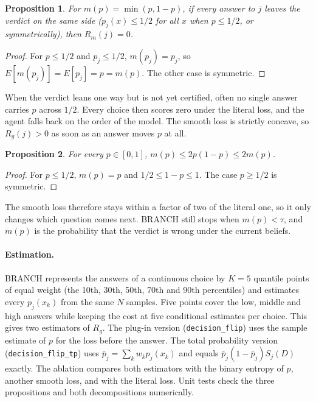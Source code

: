 \documentclass{article}
\newtheorem{proposition}{Proposition}
\begin{document}
\begin{proposition}\label{prop:stall}
For $m(p)=\min(p,1-p)$, if every answer to $j$ leaves the verdict on the same side ($p_j(x)\le 1/2$ for
all $x$ when $p\le 1/2$, or symmetrically), then $R_m(j)=0$.
\end{proposition}
\begin{proof}
For $p\le 1/2$ and $p_j\le 1/2$, $m(p_j)=p_j$, so $E[m(p_j)]=E[p_j]=p=m(p)$. The other case is symmetric.
\end{proof}

When the verdict leans one way but is not yet certified, often no single answer carries $p$ across
$1/2$. Every choice then scores zero under the literal loss, and the agent falls back on the order of the
model. The smooth loss is strictly concave, so $R_g(j)>0$ as soon as an answer moves $p$ at all.

\begin{proposition}\label{prop:bounds}
For every $p\in[0,1]$, $m(p)\le 2p(1-p)\le 2m(p)$.
\end{proposition}
\begin{proof}
For $p\le 1/2$, $m(p)=p$ and $1/2\le 1-p\le 1$. The case $p\ge 1/2$ is symmetric.
\end{proof}

The smooth loss therefore stays within a factor of two of the literal one, so it only changes which
question comes next. BRANCH still stops when $m(p)<\tau$, and $m(p)$ is the probability that the verdict
is wrong under the current beliefs.

\paragraph{Estimation.}
BRANCH represents the answers of a continuous choice by $K=5$ quantile points of equal weight (the
10th, 30th, 50th, 70th and 90th percentiles) and estimates every $p_j(x_k)$ from the same $N$ samples.
Five points cover the low, middle and high answers while keeping the cost at five conditional estimates
per choice. This gives two estimators of $R_g$. The plug-in
version (\texttt{decision\_flip}) uses the sample estimate of $p$ for the loss before the answer. The total
probability version (\texttt{decision\_flip\_tp}) uses $\bar p_j=\sum_k w_k p_j(x_k)$ and equals
$\bar p_j(1-\bar p_j)S_j(D)$ exactly. The ablation compares both estimators with the binary entropy of $p$,
another smooth loss, and with the literal loss. Unit tests check the three propositions and both
decompositions numerically.
\end{document}
